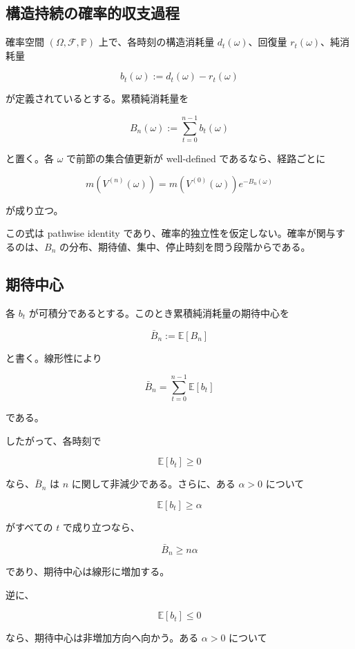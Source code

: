 \documentclass[12pt,a4paper]{article}
\begin{document}
\subsection{構造持続の確率的収支過程}\label{ux69cbux9020ux6301ux7d9aux306eux78baux7387ux7684ux53ceux652fux904eux7a0b}

確率空間 \((\Omega,\mathcal F,\mathbb P)\) 上で、各時刻の構造消耗量 \(d_{t}(\omega)\)、回復量 \(r_{t}(\omega)\)、純消耗量

\[
b_{t}(\omega) := d_{t}(\omega)-r_{t}(\omega)
\]

が定義されているとする。累積純消耗量を

\[
B_{n}(\omega) := \sum_{t=0}^{n-1} b_{t}(\omega)
\]

と置く。各 \(\omega\) で前節の集合値更新が well-defined であるなら、経路ごとに

\[
m(V^{(n)}(\omega)) = m(V^{(0)}(\omega)) e^{-B_{n}(\omega)}
\]

が成り立つ。

この式は pathwise identity であり、確率的独立性を仮定しない。確率が関与するのは、\(B_{n}\) の分布、期待値、集中、停止時刻を問う段階からである。

\subsection{期待中心}\label{ux671fux5f85ux4e2dux5fc3}

各 \(b_{t}\) が可積分であるとする。このとき累積純消耗量の期待中心を

\[
\bar B_{n} := \mathbb E[B_{n}]
\]

と書く。線形性により

\[
\bar B_{n} = \sum_{t=0}^{n-1} \mathbb E[b_{t}]
\]

である。

したがって、各時刻で

\[
\mathbb E[b_{t}] \ge 0
\]

なら、\(\bar B_{n}\) は \(n\) に関して非減少である。さらに、ある \(\alpha>0\) について

\[
\mathbb E[b_{t}] \ge \alpha
\]

がすべての \(t\) で成り立つなら、

\[
\bar B_{n} \ge n\alpha
\]

であり、期待中心は線形に増加する。

逆に、

\[
\mathbb E[b_{t}] \le 0
\]

なら、期待中心は非増加方向へ向かう。ある \(\alpha>0\) について
\end{document}
